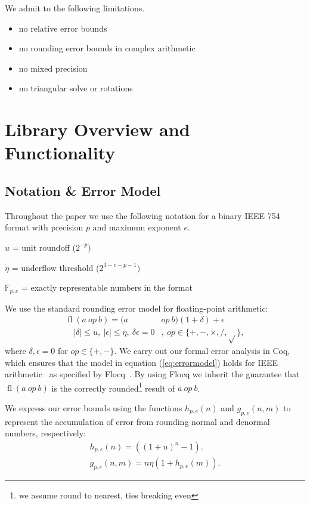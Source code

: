 \documentclass[conference]{IEEEtran}
\newcommand{\fl}{\operatorname{fl}}
\begin{document}
We admit to the following limitations.
\begin{itemize}
    \item no relative error bounds
    \item no rounding error bounds in complex arithmetic 
    \item no mixed precision
    \item no triangular solve or rotations
\end{itemize}

\section{Library Overview and Functionality}

\subsection{Notation \& Error Model}\label{sec:notation}
Throughout the paper we use the following notation for a binary IEEE 754 format with precision $p$ and maximum exponent $e$. 
\begin{description}
  \item $u$ =  unit roundoff ($2^{-p})$
  \item $\eta$ = underflow threshold ($2^{3-e-p-1})$
  \item $\mathbb{F}_{p,e}$ = exactly representable numbers in the format
\end{description}

We use the standard rounding error model for floating-point arithmetic:
\begin{align}
    \fl(a \ op \ b) = (a \ & op \ b)(1 + \delta) + \epsilon \label{eq:errormodel} \\  
    \quad |\delta| \le u, \ |\epsilon| \le \eta, \ \delta \epsilon = 0 &, \  op \in \{+, -, \times, / , \sqrt{}\} \nonumber, 
\end{align}
where $\delta,\epsilon = 0$ for $op \in \{+, -\} $. We carry out our formal error analysis in Coq, which ensures that the model in equation (\ref{eq:errormodel}) holds for IEEE arithmetic~\cite{IEEEstd} as specified by Flocq~\cite{flocq}. By using Flocq we inherit the guarantee that $\fl(a \ op \ b)$ is the correctly rounded\footnote{we assume round to nearest, ties breaking even} result of $a \ op \ b$.

We express our error bounds using the functions $h_{p,e}(n)$ and $g_{p,e}(n,m)$ to represent the accumulation of error from rounding normal and denormal numbers, respectively:
\begin{align}
    h_{p,e}(n) = ((1 + u) ^n - 1). \label{eq:hdef} \\
    g_{p,e}(n,m)= n\eta (1 + h_{p,e}(m)). \label{eq:gdef}
\end{align}
\end{document}
